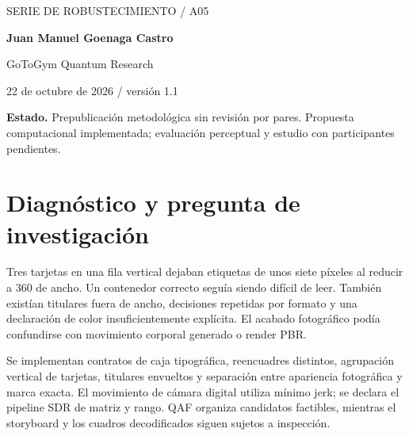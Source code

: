 \documentclass[10pt,a4paper]{article}
\begin{document}
\begin{center}{\sffamily\small\textcolor{mint}{SERIE DE ROBUSTECIMIENTO / A05}}\par\vspace{10pt}{\sffamily\LARGE\bfseries\textcolor{ink}{Composición, movimiento y legibilidad de marca}}\par\vspace{7pt}{\large Restricciones de encuadre y color para dos formatos}\par\vspace{12pt}\textbf{Juan Manuel Goenaga Castro}\par GoToGym Quantum Research\par 22 de octubre de 2026 / versión 1.1\end{center}\colorbox{ink!6}{\parbox{.96\linewidth}{\small\textbf{Estado.} Prepublicación metodológica sin revisión por pares. Propuesta computacional implementada; evaluación perceptual y estudio con participantes pendientes.}}\begin{abstract}Se implementan contratos de caja tipográfica, reencuadres distintos, agrupación vertical de tarjetas, titulares envueltos y separación entre apariencia fotográfica y marca exacta. El movimiento de cámara digital utiliza mínimo jerk; se declara el pipeline SDR de matriz y rango. QAF organiza candidatos factibles, mientras el storyboard y los cuadros decodificados siguen sujetos a inspección. Se presenta el problema observado, una formalización con unidades y restricciones, el código correspondiente y sus controles. Se distingue la verificación de ingeniería de calidad percibida, identidad regional y efecto comercial. El uso QAF corresponde a la región clásica identificable y conserva un comparador con los mismos recursos.\end{abstract}
\section{Diagnóstico y pregunta de investigación}
Tres tarjetas en una fila vertical dejaban etiquetas de unos siete píxeles al reducir a 360 de ancho. Un contenedor correcto seguía siendo difícil de leer. También existían titulares fuera de ancho, decisiones repetidas por formato y una declaración de color insuficientemente explícita. El acabado fotográfico podía confundirse con movimiento corporal generado o render PBR.

Se implementan contratos de caja tipográfica, reencuadres distintos, agrupación vertical de tarjetas, titulares envueltos y separación entre apariencia fotográfica y marca exacta. El movimiento de cámara digital utiliza mínimo jerk; se declara el pipeline SDR de matriz y rango. QAF organiza candidatos factibles, mientras el storyboard y los cuadros decodificados siguen sujetos a inspección.
\end{document}
